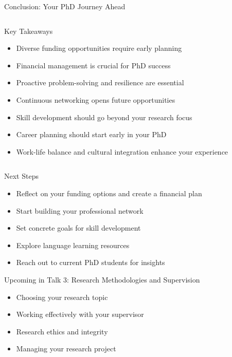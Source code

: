 \documentclass[aspectratio=169,10pt]{beamer}
\begin{document}
\begin{frame}{Conclusion: Your PhD Journey Ahead}
\begin{columns}[T]
    \begin{column}{0.6\textwidth}
        \alert{Key Takeaways}
        \begin{itemize}
            \item Diverse funding opportunities require early planning
            \item Financial management is crucial for PhD success
            \item Proactive problem-solving and resilience are essential
            \item Continuous networking opens future opportunities
            \item Skill development should go beyond your research focus
            \item Career planning should start early in your PhD
            \item Work-life balance and cultural integration enhance your experience
        \end{itemize}
    \end{column}
    \begin{column}{0.4\textwidth}
    \end{column}
\end{columns}

\vspace{0.5cm}
\alert{Next Steps}
\begin{itemize}
    \item Reflect on your funding options and create a financial plan
    \item Start building your professional network
    \item Set concrete goals for skill development
    \item Explore language learning resources
    \item Reach out to current PhD students for insights
\end{itemize}

\alert{Upcoming in Talk 3: Research Methodologies and Supervision}
\begin{itemize}
    \item Choosing your research topic
    \item Working effectively with your supervisor
    \item Research ethics and integrity
    \item Managing your research project
\end{itemize}
\end{frame}
\end{document}

